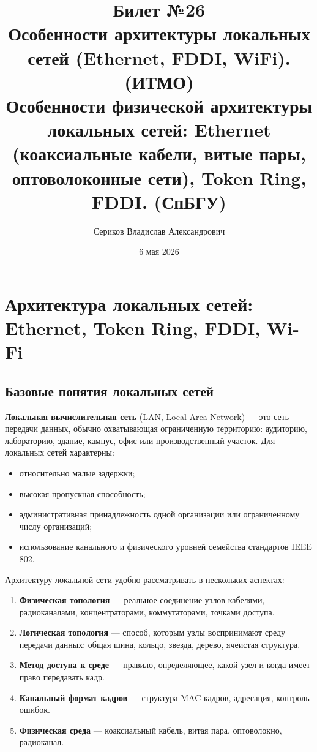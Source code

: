 \documentclass[12pt,a4paper]{article}
\title{Билет №26 \\ \small Особенности архитектуры локальных сетей (Ethernet, FDDI, WiFi). (ИТМО) \\ Особенности физической архитектуры локальных сетей: Ethernet (коаксиальные кабели, витые пары, оптоволоконные сети), Token Ring, FDDI. (СпБГУ)}
\author{Сериков Владислав Александрович}
\date{6 мая 2026}
\begin{document}
\maketitle
\tableofcontents
\newpage

\section{Архитектура локальных сетей: Ethernet, Token Ring, FDDI, Wi-Fi}

\subsection{Базовые понятия локальных сетей}

\textbf{Локальная вычислительная сеть} (LAN, Local Area Network) --- это сеть передачи данных, обычно охватывающая ограниченную территорию: аудиторию, лабораторию, здание, кампус, офис или производственный участок. Для локальных сетей характерны:
\begin{itemize}
    \item относительно малые задержки;
    \item высокая пропускная способность;
    \item административная принадлежность одной организации или ограниченному числу организаций;
    \item использование канального и физического уровней семейства стандартов IEEE 802.
\end{itemize}

Архитектуру локальной сети удобно рассматривать в нескольких аспектах:
\begin{enumerate}
    \item \textbf{Физическая топология} --- реальное соединение узлов кабелями, радиоканалами, концентраторами, коммутаторами, точками доступа.
    \item \textbf{Логическая топология} --- способ, которым узлы воспринимают среду передачи данных: общая шина, кольцо, звезда, дерево, ячеистая структура.
    \item \textbf{Метод доступа к среде} --- правило, определяющее, какой узел и когда имеет право передавать кадр.
    \item \textbf{Канальный формат кадров} --- структура MAC-кадров, адресация, контроль ошибок.
    \item \textbf{Физическая среда} --- коаксиальный кабель, витая пара, оптоволокно, радиоканал.
\end{enumerate}
\end{document}
